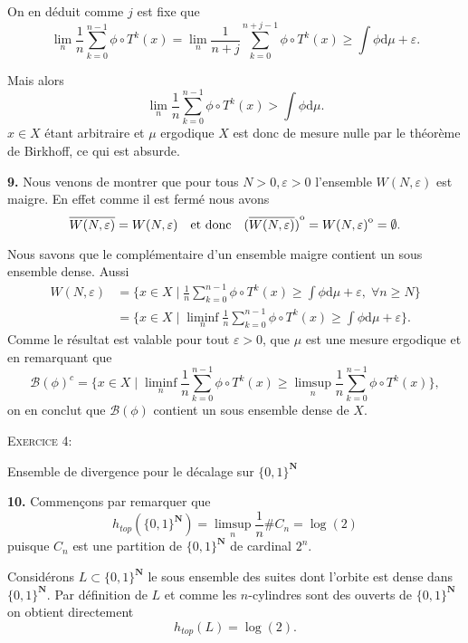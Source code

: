 \documentclass[12pt]{article}
\newenvironment{ex}[1]
{\begin{mdframed}[linewidth=0.6pt]
        \textsc{Exercice #1:}

}
    {\end{mdframed}}
\newcommand{\N}{\mathbf{N}}
\newcommand{\de}{\mathrm{d}}
\newcommand{\interior}[1]{%
  {\kern0pt#1}^{\mathrm{o}}%
}
\begin{document}
On en déduit comme $j$ est fixe que \[
        \lim_{n}\frac{1}{n}\sum_{k=0}^{n-1} \phi\circ T^{k}(x) = \lim_{n}\frac{1}{n+j}\sum_{k=0}^{n+j-1} \phi\circ T^{k}(x) \ge \int\phi\de\mu + \varepsilon
.\] 

Mais alors \[
\lim_{n}\frac{1}{n}\sum_{k=0}^{n-1} \phi\circ T^{k}(x) > \int\phi\de\mu 
.\] $x \in X$ étant arbitraire et $\mu$ ergodique $X$ est donc de mesure nulle par le théorème de Birkhoff, ce qui est absurde. 

\bigskip

\textbf{9.} Nous venons de montrer que pour tous $N >0, \varepsilon > 0$ l'ensemble $W(N,\varepsilon)$ est maigre. En effet comme il est fermé nous avons  \[
        \overline{W(N,\varepsilon)} = W(N,\varepsilon) \quad \text{et donc} \quad \interior{(\overline{W(N,\varepsilon)})} = \interior{W(N,\varepsilon)} = \emptyset 
.\] 

Nous savons que le complémentaire d'un ensemble maigre contient un sous ensemble dense. Aussi
\begin{align*}
        W(N, \varepsilon) &= \{x\in X \;|\; \frac{1}{n}\sum_{k=0}^{n-1} \phi\circ T^{k}(x) \ge \int\phi\de\mu + \varepsilon, \; \forall n \ge N\} \\
                          &= \{x \in X \;|\; \liminf_{n} \frac{1}{n}\sum_{k=0}^{n-1} \phi\circ T^{k}(x) \ge \int\phi\de\mu + \varepsilon\}
.\end{align*}
Comme le résultat est valable pour tout $\varepsilon > 0$, que $\mu$ est une mesure ergodique et en remarquant que  \[
        \mathcal{B}(\phi)^{c} = \{x\in X \;|\; \liminf_{n}\frac{1}{n}\sum_{k=0}^{n-1} \phi\circ T^{k}(x) \ge \limsup_{n} \frac{1}{n}\sum_{k=0}^{n-1} \phi\circ T^{k}(x)\} 
,\] on en conclut que $\mathcal{B}(\phi)$ contient un sous ensemble dense de $X$. 

\bigskip

\begin{ex}{4}
       Ensemble de divergence pour le décalage sur $\{0,1\}^{\N}$ 
\end{ex}

\textbf{10.} Commençons par remarquer que \[
        h_{top}(\{0,1\}^{\N}) = \limsup_{n}\frac{1}{n}\#C_{n} = \log(2)
\] puisque $C_{n}$ est une partition de $\{0,1\}^{\N}$ de cardinal $2^{n}$. 

Considérons $L \subset \{0,1\}^{\N}$ le sous ensemble des suites dont l'orbite est dense dans $\{0,1\}^{\N}$. Par définition de $L$ et comme les $n$-cylindres sont des ouverts de $\{0,1\}^{\N}$ on obtient directement \[
        h_{top}(L) = \log(2)
.\] 
\end{document}
